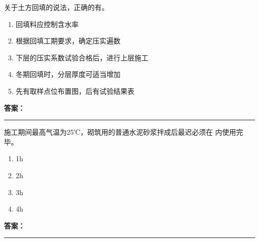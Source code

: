\documentclass[UTF8,fontset=fandol,11pt]{ctexart}
\newcommand{\answerline}{\textcolor{answerred}{\rule{2.4cm}{0.7pt}}}
\begin{document}
\begin{quizbox}[title={乱序第 73 题｜第一章土方工程}]

关于土方回填的说法，正确的有。\\

\begin{enumerate}[label=\Alph*.]

\item 回填料应控制含水率

\item 根据回填工期要求，确定压实遍数

\item 下层的压实系数试验合格后，进行上层施工

\item 冬期回填时，分层厚度可适当增加

\item 先有取样点位布置图，后有试验结果表

\end{enumerate}

\textbf{\textcolor{answerred}{答案：}} \answerline

\end{quizbox}

\vspace{0.2em}

\begin{quizbox}[title={乱序第 74 题｜第六章砌筑工程}]

施工期间最高气温为25℃，砌筑用的普通水泥砂浆拌成后最迟必须在 内使用完毕。\\

\begin{enumerate}[label=\Alph*.]

\item 1h

\item 2h

\item 3h

\item 4h

\end{enumerate}

\textbf{\textcolor{answerred}{答案：}} \answerline

\end{quizbox}

\vspace{0.2em}
\end{document}

